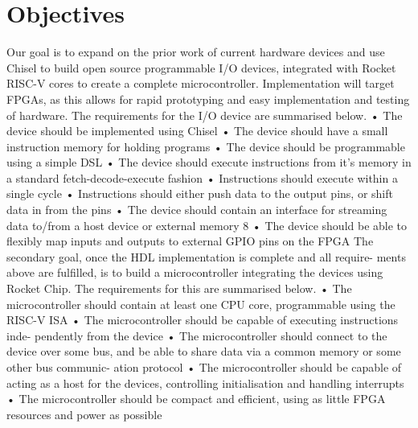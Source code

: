 \chapter{Objectives}
\label{ch:objectives}


Our goal is to expand on the prior work of current hardware devices and
use Chisel to build open source programmable I/O devices, integrated with
Rocket RISC-V cores to create a complete microcontroller. Implementation will
target FPGAs, as this allows for rapid prototyping and easy implementation
and testing of hardware. The requirements for the I/O device are summarised
below.
• The device should be implemented using Chisel
• The device should have a small instruction memory for holding programs
• The device should be programmable using a simple DSL
• The device should execute instructions from it’s memory in a standard
fetch-decode-execute fashion
• Instructions should execute within a single cycle
• Instructions should either push data to the output pins, or shift data in
from the pins
• The device should contain an interface for streaming data to/from a host
device or external memory
8
• The device should be able to flexibly map inputs and outputs to external
GPIO pins on the FPGA
The secondary goal, once the HDL implementation is complete and all require-
ments above are fulfilled, is to build a microcontroller integrating the devices
using Rocket Chip. The requirements for this are summarised below.
• The microcontroller should contain at least one CPU core, programmable
using the RISC-V ISA
• The microcontroller should be capable of executing instructions inde-
pendently from the device
• The microcontroller should connect to the device over some bus, and be
able to share data via a common memory or some other bus communic-
ation protocol
• The microcontroller should be capable of acting as a host for the devices,
controlling initialisation and handling interrupts
• The microcontroller should be compact and efficient, using as little FPGA
resources and power as possible
